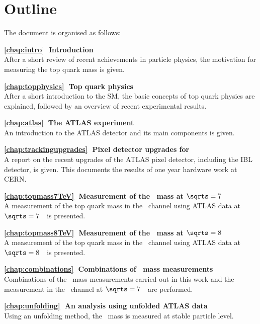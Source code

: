 \chapter*{Outline}
%
The document is organised as follows:
%
\begin{description}
\item{\bf{\ref{chap:intro}$~~~$Introduction}} 
\\ After a short review of recent achievements in particle physics, the motivation for measuring the top quark mass is given.

\item{\bf{\ref{chap:topphysics}$~~~$Top quark physics}} 
\\ After a short introduction to the \gls{SM}, the basic concepts of top quark physics are explained, followed by an overview of recent experimental results.

\item{\bf{\ref{chap:atlas}$~~~$The ATLAS experiment}} 
\\ An introduction to the \gls{ATLAS} detector and its main components is given.

\item{\bf{{\ref{chap:trackingupgrades}$~~~$Pixel detector upgrades for \RunTwo}}} 
\\ A report on the recent upgrades of the ATLAS pixel detector, including the \gls{IBL} detector, is given. This documents the results of one year hardware work at \gls{CERN}.

\item{\bf{\ref{chap:topmass7TeV}$~~~$Measurement of the \tquark\ mass at \boldmath$\sqrts=7$~\TeV}}
\\ A measurement of the top quark mass in the \dil\ channel using \gls{ATLAS} data at $\sqrts = 7$~\TeV\ is presented.

\item{\bf{\ref{chap:topmass8TeV}$~~~$Measurement of the \tquark\ mass at \boldmath$\sqrts=8$~\TeV}}
\\ A measurement of the top quark mass in the \dil\ channel using \gls{ATLAS} data at $\sqrts = 8$~\TeV\ is presented.

\item{\bf{\ref{chap:combinations}$~~~$Combinations of \tquark\ mass measurements}}
\\ Combinations of the \tquark\ mass measurements carried out in this work and the measurement in the \ljets\ channel at $\sqrts=7$~\TeV\ are performed.

\item{\bf{\ref{chap:unfolding}$~~~$An analysis using unfolded ATLAS data}}
\\ Using an unfolding method, the \tquark\ mass is measured at stable particle level.


\end{description}
